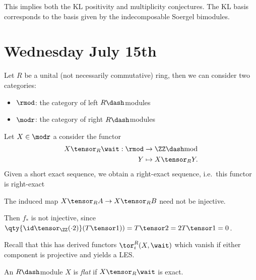 \begin{remark}

This implies both the KL positivity and multiplicity conjectures. The KL
basis corresponds to the basis given by the indecomposable Soergel
bimodules.

\end{remark}

\hypertarget{wednesday-july-15th}{%
\section{Wednesday July 15th}\label{wednesday-july-15th}}

Let \(R\) be a unital (not necessarily commutative) ring, then we can
consider two categories:

\begin{itemize}
\tightlist
\item
  \(\rmod\): the category of left \(R\dash\)modules
\item
  \(\modr\): the category of right \(R\dash\)modules
\end{itemize}

Let \(X\in \modr\) a consider the functor
\begin{align*}
X\tensor_R \wait: \rmod &\to \ZZ\dash\text{mod} \\
Y &\mapsto X\tensor_R Y
.\end{align*} Given a short exact sequence, we obtain a right-exact
sequence, i.e.~this functor is right-exact

\begin{warning}

The induced map \(X\tensor_R A \to X\tensor_R B\) need not be injective.

\begin{center}\end{center}

\end{warning}

Then \(f_*\) is not injective, since
\(\qty{\id \tensor_\ZZ (\cdot 2)} (T\tensor 1)) = T\tensor 2 = 2T\tensor 1 = 0\).

Recall that this has derived functors \(\tor_i^R(X, \wait)\) which
vanish if either component is projective and yields a LES.

\begin{definition}

An \(R\dash\)module \(X\) is \emph{flat} if \(X\tensor_R \wait\) is
exact.

\end{definition}

